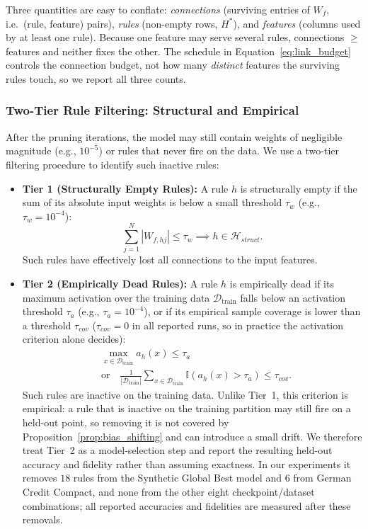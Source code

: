 Three quantities are easy to conflate: \emph{connections} (surviving entries of
$W_f$, i.e.\ (rule, feature) pairs), \emph{rules} (non-empty rows, $H^*$), and
\emph{features} (columns used by at least one rule). Because one feature may serve
several rules, connections $\ge$ features and neither fixes the other. The
schedule in Equation~\eqref{eq:link_budget} controls the connection budget, not
how many \emph{distinct} features the surviving rules touch, so we report all
three counts.

\subsubsection{Two-Tier Rule Filtering: Structural and Empirical}
\label{subsec:two_tier}
After the pruning iterations, the model may still contain weights of negligible magnitude (e.g., $10^{-5}$) or rules that never fire on the data. We use a two-tier filtering procedure to identify such inactive rules:
\begin{itemize}
    \item \textbf{Tier 1 (Structurally Empty Rules):} A rule $h$ is structurally empty if the sum of its absolute input weights is below a small threshold $\tau_w$ (e.g., $\tau_w = 10^{-4}$):
    \begin{equation}
    \sum_{j=1}^N |W_{f,hj}| \le \tau_w \implies h \in \mathcal{H}_{struct}.
    \end{equation}
    Such rules have effectively lost all connections to the input features.
    \item \textbf{Tier 2 (Empirically Dead Rules):} A rule $h$ is empirically dead if its maximum activation over the training data $\mathcal{D}_{\text{train}}$ falls below an activation threshold $\tau_a$ (e.g., $\tau_a = 10^{-4}$), or if its empirical sample coverage is lower than a threshold $\tau_{cov}$
($\tau_{cov} = 0$ in all reported runs, so in practice the activation criterion alone
decides):
    \begin{align}
    &\max_{x \in \mathcal{D}_{\text{train}}} a_h(x) \le \tau_a \nonumber\\
    &\text{or}\quad \frac{1}{|\mathcal{D}_{\text{train}}|} \sum_{x \in \mathcal{D}_{\text{train}}} \mathbb{I}(a_h(x) > \tau_a) \le \tau_{cov}.
    \end{align}
    Such rules are inactive on the training data. Unlike Tier~1, this criterion is
    empirical: a rule that is inactive on the training partition may still fire on
    a held-out point, so removing it is not covered by
    Proposition~\ref{prop:bias_shifting} and can introduce a small drift. We
    therefore treat Tier~2 as a model-selection step and report the resulting
    held-out accuracy and fidelity rather than assuming exactness. In our
    experiments it removes $18$ rules from the Synthetic Global Best model and
    $6$ from German Credit Compact, and none from the other eight
    checkpoint/dataset combinations; all reported accuracies and fidelities are
    measured after these removals.
\end{itemize}

